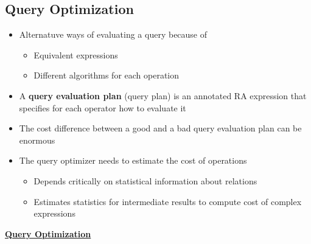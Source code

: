 \subsection{Query Optimization}
\begin{itemize}[label=\(\rhd\)]
    \item Alternatuve ways of evaluating a query because of 
    \begin{itemize}[label=\(\rhd\)]
        \item Equivalent expressions
        \item Different algorithms for each operation 
    \end{itemize}
    \item A \textbf{query evaluation plan} (query plan) is an annotated RA expression that specifies for each operator how to evaluate it 
    \item The cost difference between a good and a bad query evaluation plan can be enormous 
    \item The query optimizer needs to estimate the cost of operations
    \begin{itemize}[label=\(\rhd\)]
        \item Depends critically on statistical information about relations
        \item Estimates statistics for intermediate results to compute cost of complex expressions
    \end{itemize}
\end{itemize}

\bigskip
\textbf{\underline{Query Optimization}}\\


